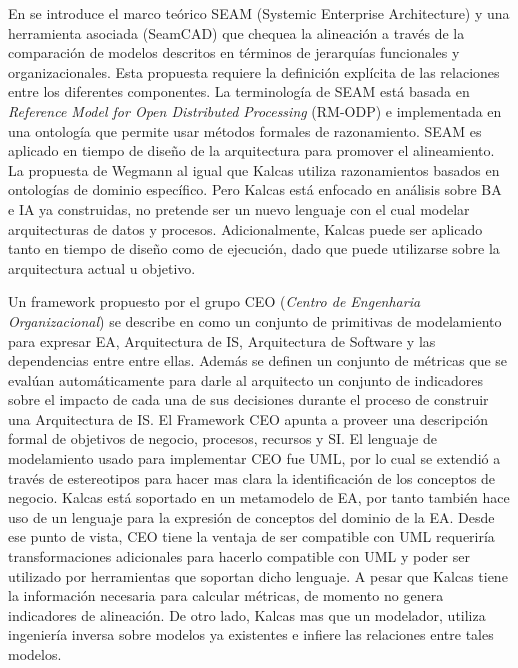 En \cite{Wegmann:2005} se introduce el marco te\'orico SEAM (Systemic Enterprise Architecture) y una herramienta asociada (SeamCAD) que chequea la alineaci\'on a trav\'es de la comparaci\'on de modelos descritos en t\'erminos de jerarqu\'ias funcionales y organizacionales. Esta propuesta requiere la definici\'on expl\'icita de las relaciones entre los diferentes componentes. La terminolog\'ia de SEAM est\'a basada en \textit{Reference Model for Open Distributed Processing} (RM-ODP) e implementada en una ontolog\'ia que permite usar m\'etodos formales de razonamiento. SEAM es aplicado en tiempo de dise\~no de la arquitectura para promover el alineamiento. La propuesta de Wegmann al igual que Kalcas utiliza razonamientos basados en ontolog\'ias de dominio espec\'ifico. Pero Kalcas est\'a enfocado en an\'alisis sobre BA e IA ya construidas, no pretende ser un nuevo lenguaje con el cual modelar arquitecturas de datos y procesos. Adicionalmente, Kalcas puede ser aplicado tanto en tiempo de dise\~no como de ejecuci\'on, dado que puede utilizarse sobre la arquitectura actual u objetivo.

Un framework propuesto por el grupo CEO (\textit{Centro de Engenharia Organizacional}) se describe en \cite{Vasconcelos:2007} como un conjunto de primitivas de modelamiento para expresar EA, Arquitectura de IS, Arquitectura de Software y las dependencias entre entre ellas. Adem\'as se definen un conjunto de m\'etricas que se eval\'uan autom\'aticamente para darle al arquitecto un conjunto de indicadores sobre el impacto de cada una de sus decisiones durante el proceso de construir una Arquitectura de IS. El Framework CEO apunta a proveer una descripci\'on formal de objetivos de negocio, procesos, recursos y SI. El lenguaje de modelamiento usado para implementar CEO fue UML, por lo cual se extendi\'o a trav\'es de estereotipos para hacer mas clara la identificaci\'on de los conceptos de negocio. Kalcas est\'a soportado en un metamodelo de EA, por tanto tambi\'en hace uso de un lenguaje para la expresi\'on de conceptos del dominio de la EA. Desde ese punto de vista, CEO tiene la ventaja de ser compatible con UML requerir\'ia transformaciones adicionales para hacerlo compatible con UML y poder ser utilizado por herramientas que soportan dicho lenguaje. A pesar que Kalcas tiene la informaci\'on necesaria para calcular m\'etricas, de momento no genera indicadores de alineaci\'on. De otro lado, Kalcas mas que un modelador, utiliza ingenier\'ia inversa sobre modelos ya existentes e infiere las relaciones entre tales modelos.

